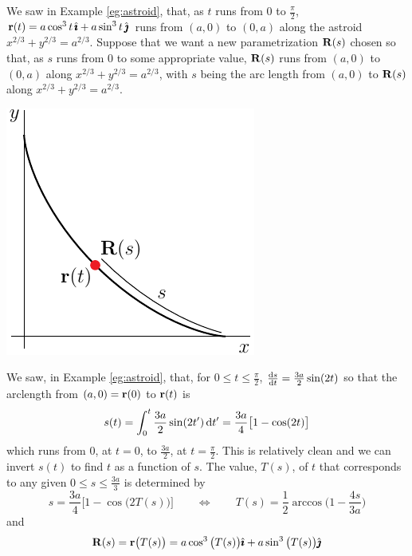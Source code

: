 \begin{eg}\label{eg:reparamAstroid}
We saw in Example \ref{eg:astroid}, that, as $t$ runs from $0$ to 
$\frac{\pi}{2}$, $\mathbf{r}(t) = a \cos^3 t\,\hat{\pmb{\imath}}+a\sin^3t\,\hat{\pmb{\jmath}}$ runs from 
$(a,0)$ to $(0,a)$ along the astroid $x^{2/3}+y^{2/3}=a^{2/3}$.
Suppose that we want a new parametrization $\mathbf{R}(s)$ chosen so that, 
as $s$ runs from $0$ to some appropriate value, $\mathbf{R}(s)$ runs from 
$(a,0)$ to $(0,a)$ along $x^{2/3}+y^{2/3}=a^{2/3}$, with $s$ being
the arc length from $(a,0)$ to $\mathbf{R}(s)$ along $x^{2/3}+y^{2/3}=a^{2/3}$.
\begin{efig}
\begin{center}
     \includegraphics{astroidS.pdf}
\end{center}
\end{efig}
We saw, in Example \ref{eg:astroid}, that, for $0\le t\le \frac{\pi}{2}$, $\diff{s}{t}=\frac{3a}{2}\sin(2t)$ so that the arclength from $(a,0)=\mathbf{r}(0)$ 
to $\mathbf{r}(t)$ is
\begin{equation*}
s(t) = \int_0^t\frac{3a}{2}\sin(2t')\,\mathrm{d}t' =\frac{3a}{4}\big[1-\cos(2t)\big]
\end{equation*}
which runs from $0$, at $t=0$, to $\frac{3a}{2}$, at $t=\frac{\pi}{2}$.
This is relatively clean and we can invert $s(t)$ to find $t$ 
as a function of $s$.
The value, $T(s)$, of $t$ that corresponds to any given 
$0\le s\le\frac{3a}{3}$ is determined by
\begin{equation*}
s=\frac{3a}{4}\big[1-\cos\big(2T(s)\big)\big]\qquad
\iff\qquad
T(s)=\frac{1}{2}\arccos\Big(1-\frac{4s}{3a}\Big)
\end{equation*}
and
\begin{equation*}
\mathbf{R}(s) = \mathbf{r}\big(T(s)\big)
       = a\cos^3\big(T(s)\big)\hat{\pmb{\imath}} + a\sin^3 \big(T(s)\big)\hat{\pmb{\jmath}}
\end{equation*}

\end{eg}
